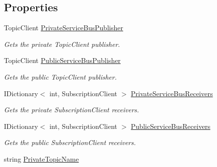 \subsection*{Properties}
\begin{DoxyCompactItemize}
\item 
Topic\+Client \hyperlink{classCqrs_1_1Azure_1_1ServiceBus_1_1AzureServiceBus_a640c513528e0037de1813d134e4d0476_a640c513528e0037de1813d134e4d0476}{Private\+Service\+Bus\+Publisher}
\begin{DoxyCompactList}\small\item\em Gets the private Topic\+Client publisher. \end{DoxyCompactList}\item 
Topic\+Client \hyperlink{classCqrs_1_1Azure_1_1ServiceBus_1_1AzureServiceBus_a17195f3c8e05ec37dfac37a8e9e1b089_a17195f3c8e05ec37dfac37a8e9e1b089}{Public\+Service\+Bus\+Publisher}
\begin{DoxyCompactList}\small\item\em Gets the public Topic\+Client publisher. \end{DoxyCompactList}\item 
I\+Dictionary$<$ int, Subscription\+Client $>$ \hyperlink{classCqrs_1_1Azure_1_1ServiceBus_1_1AzureServiceBus_ac52e1a7e17f4ffb80f95d31424101aaa_ac52e1a7e17f4ffb80f95d31424101aaa}{Private\+Service\+Bus\+Receivers}
\begin{DoxyCompactList}\small\item\em Gets the private Subscription\+Client receivers. \end{DoxyCompactList}\item 
I\+Dictionary$<$ int, Subscription\+Client $>$ \hyperlink{classCqrs_1_1Azure_1_1ServiceBus_1_1AzureServiceBus_ac73f294e6a99655f2ff7e391646f2e5d_ac73f294e6a99655f2ff7e391646f2e5d}{Public\+Service\+Bus\+Receivers}
\begin{DoxyCompactList}\small\item\em Gets the public Subscription\+Client receivers. \end{DoxyCompactList}\item 
string \hyperlink{classCqrs_1_1Azure_1_1ServiceBus_1_1AzureServiceBus_a7af8ebcdd25672ff2252085637904f82_a7af8ebcdd25672ff2252085637904f82}{Private\+Topic\+Name}

\end{DoxyCompactItemize}
